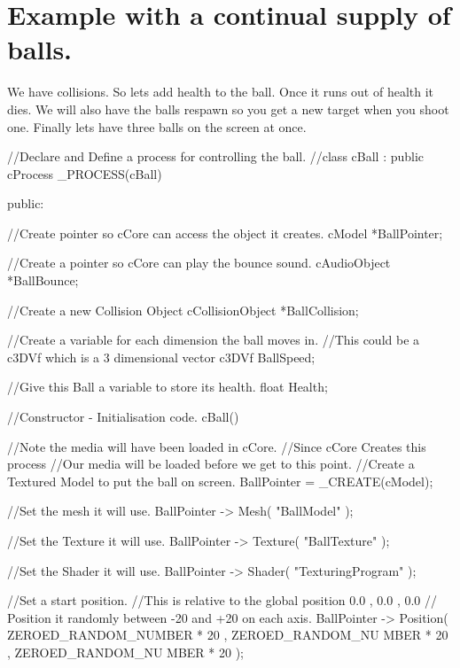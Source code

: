  \hypertarget{_code_program_examples_ReSpwaningBouncingBallExample}{}\section{Example with a continual supply of balls.}\label{_code_program_examples_ReSpwaningBouncingBallExample}
We have collisions. So lets add health to the ball. Once it runs out of health it dies. We will also have the balls respawn so you get a new target when you shoot one. Finally lets have three balls on the screen at once. 
\begin{DoxyCode}
//Declare and Define a process for controlling the ball.
//class cBall : public cProcess
 _PROCESS(cBall)
 {
 public:

        //Create pointer so cCore can  access the object it creates.
 cModel *BallPointer;

        //Create a pointer so cCore can play the bounce sound.
 cAudioObject *BallBounce;

        //Create a new Collision Object
 cCollisionObject *BallCollision;

        //Create a variable for each dimension the ball moves in.
        //This could be a c3DVf which is a 3 dimensional vector
 c3DVf BallSpeed;

        //Give this Ball a variable to store its health.
 float Health;

  //Constructor - Initialisation code.
        cBall()
        {
        //Note the media will have been loaded in cCore.
        //Since cCore Creates this process
        //Our media will be loaded before we get to this point.
        //Create a Textured Model to put the ball on screen.
                BallPointer =  _CREATE(cModel);

        //Set the mesh it will use.
                BallPointer -> Mesh( "BallModel" );

        //Set the Texture it will use.
                BallPointer -> Texture( "BallTexture" );

        //Set the Shader it will use.
                BallPointer -> Shader( "TexturingProgram" );

        //Set a start position.
        //This is relative to the global position 0.0 , 0.0 , 0.0
        // Position it randomly between -20 and +20 on each axis.
                BallPointer -> Position( ZEROED_RANDOM_NUMBER * 20 ,
                                                                 ZEROED_RANDOM_NU
      MBER * 20 ,
                                                                 ZEROED_RANDOM_NU
      MBER * 20 );

}}
\end{DoxyCode}
